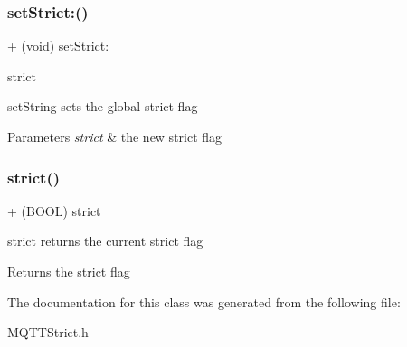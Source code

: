 \subsubsection{\texorpdfstring{set\+Strict\+:()}{setStrict:()}}
{\footnotesize\ttfamily + (void) set\+Strict\+: \begin{DoxyParamCaption}\item[{(B\+O\+OL)}]{strict }\end{DoxyParamCaption}}

set\+String sets the global strict flag 
\begin{DoxyParams}{Parameters}
{\em strict} & the new strict flag \\
\hline
\end{DoxyParams}
\mbox{\label{interface_m_q_t_t_strict_ae2662f2299f2e9936fee25522cd44cf3}} 
\subsubsection{\texorpdfstring{strict()}{strict()}}
{\footnotesize\ttfamily + (B\+O\+OL) strict \begin{DoxyParamCaption}{ }\end{DoxyParamCaption}}

strict returns the current strict flag \begin{DoxyReturn}{Returns}
the strict flag 
\end{DoxyReturn}


The documentation for this class was generated from the following file\+:\begin{DoxyCompactItemize}
\item 
M\+Q\+T\+T\+Strict.\+h\end{DoxyCompactItemize}
